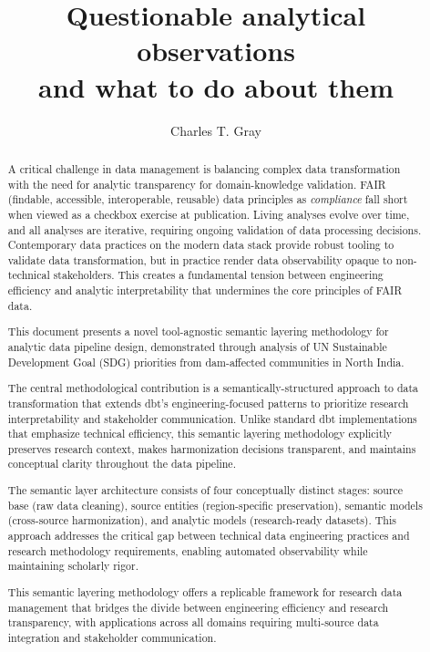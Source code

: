 \documentclass{article}
\title{Questionable analytical observations\\and what to do about them}
\author{Charles T. Gray}
\begin{document}
\maketitle



\begin{abstract}

A critical challenge in data management is balancing complex data transformation with the need for analytic transparency for domain-knowledge validation. FAIR (findable, accessible, interoperable, reusable) data principles as \textit{compliance} fall short when viewed as a checkbox exercise at publication. Living analyses evolve over time, and all analyses are iterative, requiring ongoing validation of data processing decisions. Contemporary data practices on the modern data stack provide robust tooling to validate data transformation, but in practice render data observability opaque to non-technical stakeholders. This creates a fundamental tension between engineering efficiency and analytic interpretability that undermines the core principles of FAIR data.

This document presents a novel tool-agnostic semantic layering methodology for analytic data pipeline design, demonstrated through analysis of UN Sustainable Development Goal (SDG) priorities from dam-affected communities in North India.

The central methodological contribution is a semantically-structured approach to data transformation that extends dbt's engineering-focused patterns to prioritize research interpretability and stakeholder communication. Unlike standard dbt implementations that emphasize technical efficiency, this semantic layering methodology explicitly preserves research context, makes harmonization decisions transparent, and maintains conceptual clarity throughout the data pipeline.

The semantic layer architecture consists of four conceptually distinct stages: source base (raw data cleaning), source entities (region-specific preservation), semantic models (cross-source harmonization), and analytic models (research-ready datasets). This approach addresses the critical gap between technical data engineering practices and research methodology requirements, enabling automated observability while maintaining scholarly rigor.

This semantic layering methodology offers a replicable framework for research data management that bridges the divide between engineering efficiency and research transparency, with applications across all domains requiring multi-source data integration and stakeholder communication.

\end{abstract}
\end{document}
